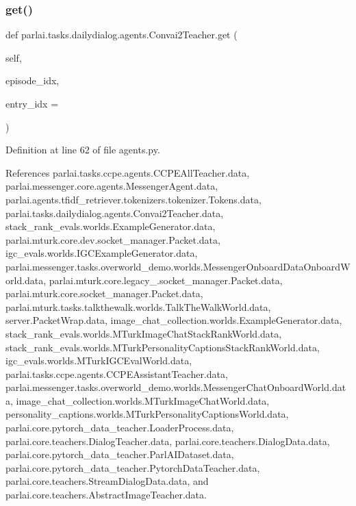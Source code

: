 \subsubsection{\texorpdfstring{get()}{get()}}
{\footnotesize\ttfamily def parlai.\+tasks.\+dailydialog.\+agents.\+Convai2\+Teacher.\+get (\begin{DoxyParamCaption}\item[{}]{self,  }\item[{}]{episode\+\_\+idx,  }\item[{}]{entry\+\_\+idx = {} }\end{DoxyParamCaption})}



Definition at line 62 of file agents.\+py.



References parlai.\+tasks.\+ccpe.\+agents.\+C\+C\+P\+E\+All\+Teacher.\+data, parlai.\+messenger.\+core.\+agents.\+Messenger\+Agent.\+data, parlai.\+agents.\+tfidf\+\_\+retriever.\+tokenizers.\+tokenizer.\+Tokens.\+data, parlai.\+tasks.\+dailydialog.\+agents.\+Convai2\+Teacher.\+data, stack\+\_\+rank\+\_\+evals.\+worlds.\+Example\+Generator.\+data, parlai.\+mturk.\+core.\+dev.\+socket\+\_\+manager.\+Packet.\+data, igc\+\_\+evals.\+worlds.\+I\+G\+C\+Example\+Generator.\+data, parlai.\+messenger.\+tasks.\+overworld\+\_\+demo.\+worlds.\+Messenger\+Onboard\+Data\+Onboard\+World.\+data, parlai.\+mturk.\+core.\+legacy\+\_.\+socket\+\_\+manager.\+Packet.\+data, parlai.\+mturk.\+core.\+socket\+\_\+manager.\+Packet.\+data, parlai.\+mturk.\+tasks.\+talkthewalk.\+worlds.\+Talk\+The\+Walk\+World.\+data, server.\+Packet\+Wrap.\+data, image\+\_\+chat\+\_\+collection.\+worlds.\+Example\+Generator.\+data, stack\+\_\+rank\+\_\+evals.\+worlds.\+M\+Turk\+Image\+Chat\+Stack\+Rank\+World.\+data, stack\+\_\+rank\+\_\+evals.\+worlds.\+M\+Turk\+Personality\+Captions\+Stack\+Rank\+World.\+data, igc\+\_\+evals.\+worlds.\+M\+Turk\+I\+G\+C\+Eval\+World.\+data, parlai.\+tasks.\+ccpe.\+agents.\+C\+C\+P\+E\+Assistant\+Teacher.\+data, parlai.\+messenger.\+tasks.\+overworld\+\_\+demo.\+worlds.\+Messenger\+Chat\+Onboard\+World.\+data, image\+\_\+chat\+\_\+collection.\+worlds.\+M\+Turk\+Image\+Chat\+World.\+data, personality\+\_\+captions.\+worlds.\+M\+Turk\+Personality\+Captions\+World.\+data, parlai.\+core.\+pytorch\+\_\+data\+\_\+teacher.\+Loader\+Process.\+data, parlai.\+core.\+teachers.\+Dialog\+Teacher.\+data, parlai.\+core.\+teachers.\+Dialog\+Data.\+data, parlai.\+core.\+pytorch\+\_\+data\+\_\+teacher.\+Parl\+A\+I\+Dataset.\+data, parlai.\+core.\+pytorch\+\_\+data\+\_\+teacher.\+Pytorch\+Data\+Teacher.\+data, parlai.\+core.\+teachers.\+Stream\+Dialog\+Data.\+data, and parlai.\+core.\+teachers.\+Abstract\+Image\+Teacher.\+data.



